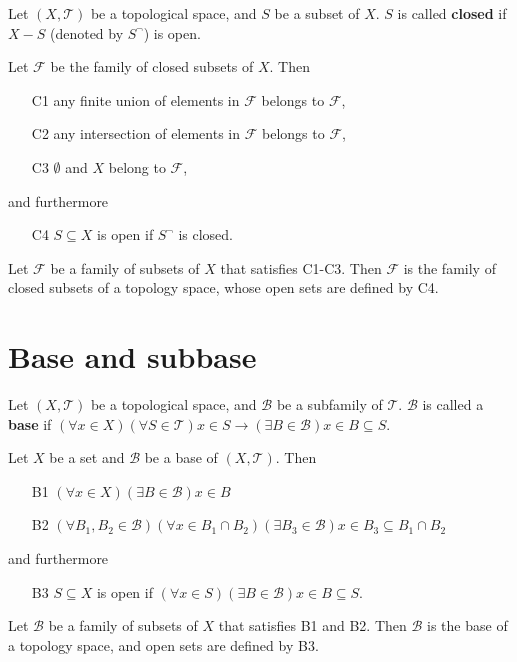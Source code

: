 \documentclass[12pt]{book}
\begin{document}
\begin{definition}
	Let $(X,\mathcal T)$ be a topological space, and $S$ be a subset of $X$. $S$ is called {\bf closed} if $X-S$ (denoted by $S^\neg$) is open. 
\end{definition}

\begin{lemma}
	Let $\mathcal F$ be the family of closed subsets of $X$. Then
	\begin{enumerate}
		\item[C1] any finite union of elements in $\mathcal F$ belongs to $\mathcal F$,
		\item[C2] any intersection of elements in $\mathcal F$ belongs to $\mathcal F$,
		\item[C3] $\emptyset$ and $X$ belong to $\mathcal F$,
	\end{enumerate}
	and furthermore
	\begin{enumerate}
		\item[C4] $S\subseteq X$ is open if $S^\neg$ is closed.
	\end{enumerate}

	Let $\mathcal F$ be a family of subsets of $X$ that satisfies C1-C3. Then $\mathcal F$ is the family of closed subsets of a topology space, whose open sets are defined by C4.
\end{lemma}

\section{Base and subbase}

\begin{definition}
	Let $(X,\mathcal T)$ be a topological space, and $\mathcal B$ be a subfamily of $\mathcal T$. $\mathcal B$ is called a {\bf base} if $(\forall x\in X)(\forall  S\in \mathcal T)x\in S\rightarrow(\exists B\in \mathcal B)x\in B\subseteq S$. 
\end{definition}

\begin{lemma}
	Let $X$ be a set and $\mathcal B$ be a base of $(X,\mathcal T)$. Then
	\begin{enumerate}
		\item[B1] $(\forall x\in X)(\exists B\in \mathcal B)x\in B$
		\item[B2] $(\forall B_1,B_2\in \mathcal B)(\forall x\in B_1\cap B_2)(\exists B_3\in \mathcal B)x\in B_3\subseteq B_1\cap B_2$
	\end{enumerate}
	and furthermore
	\begin{enumerate}
		\item[B3] $S\subseteq X$ is open if $(\forall x\in S)(\exists B\in \mathcal B)x\in B\subseteq S$.
	\end{enumerate}
	
	Let $\mathcal B$ be a family of subsets of $X$ that satisfies B1 and B2. Then $\mathcal B$ is the base of a topology space, and open sets are defined by B3.
\end{lemma}
\end{document}
